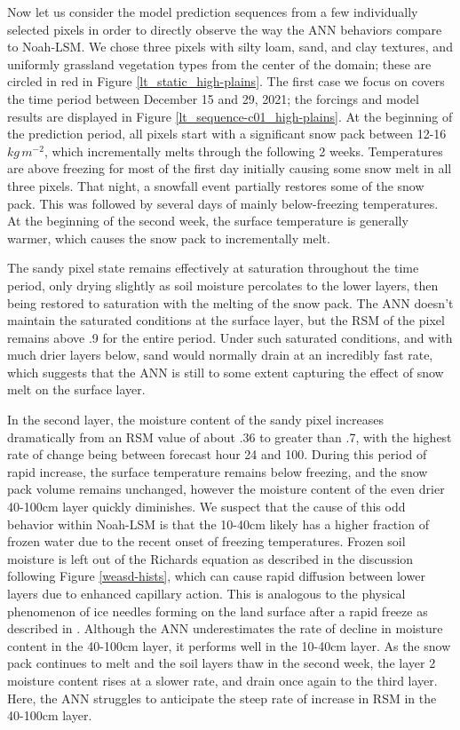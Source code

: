 Now let us consider the model prediction sequences from a few individually selected pixels in order to directly observe the way the ANN behaviors compare to Noah-LSM. We chose three pixels with silty loam, sand, and clay textures, and uniformly grassland vegetation types from the center of the domain; these are circled in red in Figure \ref{lt_static_high-plains}. The first case we focus on covers the time period between December 15 and 29, 2021; the forcings and model results are displayed in Figure \ref{lt_sequence-c01_high-plains}. At the beginning of the prediction period, all pixels start with a significant snow pack between 12-16 $kg\,m^{-2}$, which incrementally melts through the following 2 weeks. Temperatures are above freezing for most of the first day initially causing some snow melt in all three pixels. That night, a snowfall event partially restores some of the snow pack. This was followed by several days of mainly below-freezing temperatures. At the beginning of the second week, the surface temperature is generally warmer, which causes the snow pack to incrementally melt.

The sandy pixel state remains effectively at saturation throughout the time period, only drying slightly as soil moisture percolates to the lower layers, then being restored to saturation with the melting of the snow pack. The ANN doesn't maintain the saturated conditions at the surface layer, but the RSM of the pixel remains above .9 for the entire period. Under such saturated conditions, and with much drier layers below, sand would normally drain at an incredibly fast rate, which suggests that the ANN is still to some extent capturing the effect of snow melt on the surface layer.

In the second layer, the moisture content of the sandy pixel increases dramatically from an RSM value of about .36 to greater than .7, with the highest rate of change being between forecast hour 24 and 100. During this period of rapid increase, the surface temperature remains below freezing, and the snow pack volume remains unchanged, however the moisture content of the even drier 40-100cm layer quickly diminishes. We suspect that the cause of this odd behavior within Noah-LSM is that the 10-40cm likely has a higher fraction of frozen water due to the recent onset of freezing temperatures. Frozen soil moisture is left out of the Richards equation as described in the discussion following Figure \ref{weasd-hists}, which can cause rapid diffusion between lower layers due to enhanced capillary action. This is analogous to the physical phenomenon of ice needles forming on the land surface after a rapid freeze as described in \citep{lawler_observations_1989}. Although the ANN underestimates the rate of decline in moisture content in the 40-100cm layer, it performs well in the 10-40cm layer. As the snow pack continues to melt and the soil layers thaw in the second week, the layer 2 moisture content rises at a slower rate, and drain once again to the third layer. Here, the ANN struggles to anticipate the steep rate of increase in RSM in the 40-100cm layer.

